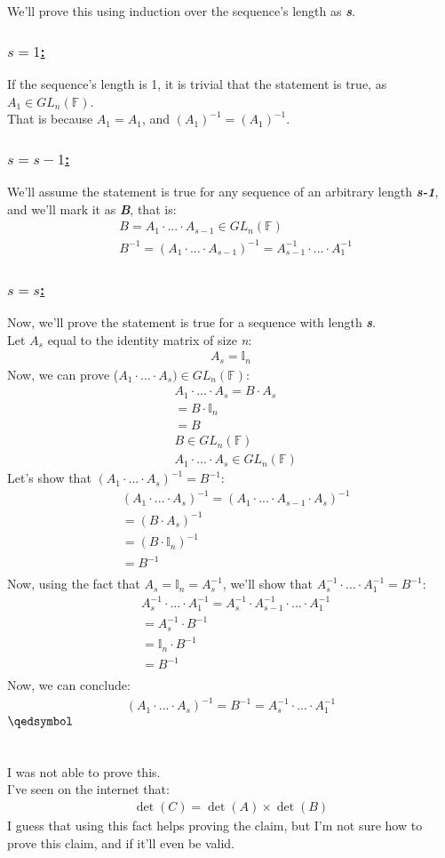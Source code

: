 \documentclass[a4paper, 12pt]{article}
\newcommand{\subsub}[1]{\subsubsection{\underline{#1}}}
\newcommand{\F}{\ensuremath{\mathbb{F}}}
\newcommand{\eq}[1]{\begin{align*}#1\end{align*}}
\renewcommand{\qed}{\hfill\(\qedsymbol\)}
\begin{document}
\setcounter{section}{13}
\section{}
We'll prove this using induction over the sequence's length as \textit{\textbf{s}}.
\subsub{$s=1$:}
If the sequence's length is 1, it is trivial that the statement is true, as ${A}_1\in{GL}_n(\F)$.\\
That is because $A_1=A_1$, and $(A_1)^{-1}=(A_1)^{-1}$.
\subsub{$s=s-1$:}
We'll assume the statement is true for any sequence of an arbitrary length \textit{\textbf{s-1}}, and we'll mark it as \textit{\textbf{B}}, that is:
\eq{
    &B=A_1\cdot...\cdot{A}_{s-1}\in{GL}_n(\F)\\
    &B^{-1}=(A_1\cdot...\cdot{A}_{s-1})^{-1}=A_{s-1}^{-1}\cdot...\cdot{A}_{1}^{-1}
}
\subsub{$s=s$:}
Now, we'll prove the statement is true for a sequence with length \textit{\textbf{s}}.\\
Let $A_s$ equal to the identity matrix of size \textit{n}:
\eq{
    A_s=\mathbb{I}_n
}
Now, we can prove ($A_1\cdot...\cdot{A}_s)\in{GL}_n(\F)$:
\eq{
    &A_1\cdot...\cdot{A}_s=B\cdot{A}_{s}\\
    &=B\cdot\mathbb{I}_n\\
    &=B\\
    &B\in{GL}_n(\F)\\
    &A_1\cdot...\cdot{A}_s\in{GL}_n(\F)
}
Let's show that $(A_1\cdot...\cdot{A}_{s})^{-1}=B^{-1}$:
\eq{
    &(A_1\cdot...\cdot{A}_{s})^{-1}=(A_1\cdot...\cdot{A}_{s-1}\cdot{A}_{s})^{-1}\\
    &=(B\cdot{A}_{s})^{-1}\\
    &=(B\cdot\mathbb{I}_n)^{-1}\\
    &=B^{-1}\\
}
Now, using the fact that ${A}_{s}=\mathbb{I}_n={A}_{s}^{-1}$, we'll show that ${A}_{s}^{-1}\cdot...\cdot{A}_{1}^{-1}=B^{-1}$:
\eq{
    &{A}_{s}^{-1}\cdot...\cdot{A}_{1}^{-1}={A}_{s}^{-1}\cdot{A}_{s-1}^{-1}\cdot...\cdot{A}_{1}^{-1}\\
    &={A}_{s}^{-1}\cdot{B}^{-1}\\
    &=\mathbb{I}_n\cdot{B}^{-1}\\
    &={B}^{-1}\\
}
Now, we can conclude:
\eq{
    (A_1\cdot...\cdot{A}_{s})^{-1}={B}^{-1}={A}_{s}^{-1}\cdot...\cdot{A}_{1}^{-1}
}
\qed\pagebreak

\setcounter{section}{16}
\section{}
I was not able to prove this.\\
I've seen on the internet that:
\eq{
    \det(C)=\det(A)\times\det(B)
}
I guess that using this fact helps proving the claim, but I'm not sure how to prove this claim, and if it'll even be valid.
\end{document}
